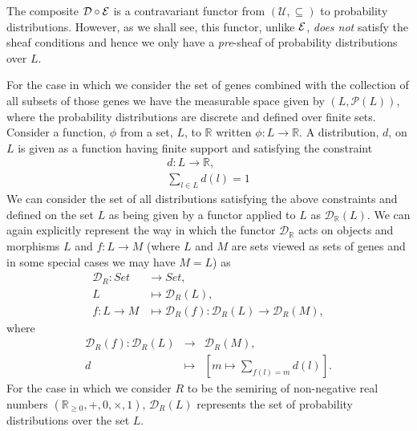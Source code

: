 The composite $\mathcal{D} \circ \mathcal{E}$ is a contravariant functor from $(\mathcal{U}, \subseteq)$ to probability distributions.  However, as we shall see, this functor, unlike $\mathcal{E}$, \emph{does not} satisfy the sheaf conditions and hence we only have a \emph{pre}-sheaf of probability distributions over $L$.

For the case in which we consider the set of genes combined with the collection of all subsets of those genes we have the measurable space given by $(L,\mathcal{P}(L))$, where the probability distributions are discrete and defined over finite sets. Consider a function, $\phi$ from a set, $L$, to $\mathbb{R}$ written $\phi \colon L \rightarrow \mathbb{R}$. A distribution, $d$, on $L$ is given as a function having finite support and satisfying the constraint
\begin{eqnarray*}
d \colon L \rightarrow \mathbb{R},\\
\sum_{l \in L} d(l) = 1
\end{eqnarray*}
We can consider the set of all distributions satisfying the above constraints and defined on the set $L$ as being given by a functor applied to $L$ as $\mathcal{D}_{\mathbb{R}} (L)$. We can again explicitly represent the way in which the functor $\mathcal{D}_{\mathbb{R}}$ acts on objects and morphisms $L$ and $f \colon L \rightarrow M$ (where $L$ and $M$ are sets viewed as sets of genes and in some special cases we may have $M=L$) as
\begin{equation}\label{eq:distfunctor}
\begin{split}
\mathcal{D}_R \colon Set &\rightarrow Set,\\
L &\mapsto \mathcal{D}_R (L),\\
f \colon L \rightarrow M &\mapsto \mathcal{D}_R (f) \colon \mathcal{D}_R (L) \rightarrow \mathcal{D}_R (M),
\end{split}
\end{equation}
where
\begin{eqnarray*}
\mathcal{D}_R (f) \colon \mathcal{D}_R (L) &\rightarrow& \mathcal{D}_R (M),\\
d &\mapsto& \left[ m \mapsto \sum_{f(l)=m} d(l) \right].
\end{eqnarray*}
For the case in which we consider $R$ to be the semiring of non-negative real numbers $\left( \mathbb{R}_{\geq 0},+,0,\times,1 \right)$, $\mathcal{D}_R (L)$ represents the set of probability distributions over the set $L$.

